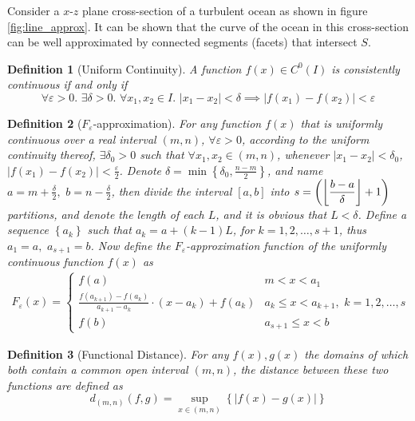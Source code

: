 \documentclass{article}
\DeclarePairedDelimiter\floor{\lfloor}{\rfloor}
\newtheorem{definition}{Definition}
\begin{document}
Consider a $x$-$z$ plane cross-section of a turbulent ocean as shown in figure \ref{fig:line_approx}. It can be shown that the curve of the ocean in this cross-section can be well approximated by connected segments (facets) that intersect $S$.

\phantom{ }
\begin{definition}[Uniform Continuity]
A function $f(x)\in C^0(I)$ is consistently continuous if and only if
\[
\forall\varepsilon>0.\,\,\exists\delta>0.\,\,\forall x_1,x_2\in I.\,\,\left|x_1-x_2\right|<\delta\implies\left|f(x_1)-f(x_2)\right|<\varepsilon
\]
\end{definition}

\begin{definition}[$F_\varepsilon$-approximation]
For any function $f(x)$ that is uniformly continuous over a real interval $(m,n)$, $\forall\varepsilon>0$, according to the uniform continuity thereof, $\exists\delta_0>0$ such that $\forall x_1,x_2\in(m,n)$, whenever $\left|x_1-x_2\right|<\delta_0$, $\displaystyle{\left|f(x_1)-f(x_2)\right|<\frac{\varepsilon}{2}}$. Denote $\displaystyle{\delta=\min\left\{\delta_0,\frac{n-m}{2}\right\}}$, and name $\displaystyle{a=m+\frac{\delta}{2},\,\,b=n-\frac{\delta}{2}}$, then divide the interval $[a,b]$ into $\displaystyle{s=\left(\floor*{\frac{b-a}{\delta}}+1\right)}$ partitions, and denote the length of each $L$, and it is obvious that $L<\delta$. Define a sequence $\left\{a_k\right\}$ such that $a_k=a+(k-1)L$, for $k=1,2,\dots,s+1$, thus $a_1=a,\,\,a_{s+1}=b$. Now define the $F_\varepsilon$-approximation function of the uniformly continuous function $f(x)$ as
\begin{align*}
F_\varepsilon(x)=
\begin{cases}
f(a)&m<x<a_1\\
\displaystyle{\frac{f(a_{k+1})-f(a_k)}{a_{k+1}-a_k}}\cdot(x-a_k)+f(a_k)&a_k\leq x<a_{k+1},\,\,k=1,2,\dots,s\\
f(b)&a_{s+1}\leq x<b
\end{cases}
\end{align*}
\end{definition}

\begin{definition}[Functional Distance]
\label{def:functional_distance}
For any $f(x), g(x)$ the domains of which both contain a common open interval $(m,n)$, the distance between these two functions are defined as
\[
d_{(m,n)}(f,g)=\sup_{x\in(m,n)}\left\{\left|f(x)-g(x)\right|\right\}
\]
\end{definition}
\end{document}
